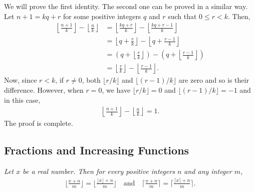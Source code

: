 \documentclass[12pt]{subfile}
\begin{document}
    \begin{solution}
    	We will prove the first identity. The second one can be proved in a similar way. Let $n+1=kq+r$ for some positive integers $q$ and $r$ such that $0 \leq r <k$. Then,
    	\begin{align*}
    	\left\lfloor \frac{n+1}{k} \right\rfloor - \left\lfloor \frac{n}{k} \right\rfloor &=\left\lfloor \frac{kq+r}{k} \right\rfloor - \left\lfloor \frac{kq+r-1}{k} \right\rfloor\\
    	&= \left\lfloor q+\frac{r}{k} \right\rfloor - \left\lfloor q+\frac{r-1}{k} \right\rfloor\\
    	&= \left(q+\left\lfloor \frac{r}{k} \right\rfloor\right) - \left(q+\left\lfloor \frac{r-1}{k} \right\rfloor\right)\\
    	&= \left\lfloor \frac{r}{k} \right\rfloor - \left\lfloor \frac{r-1}{k} \right\rfloor.
    	\end{align*}
    	Now, since $r<k$, if $r \neq 0$, both $\lfloor r/k \rfloor$ and $\lfloor (r-1)/k \rfloor$ are zero and so is their difference. However, when $r=0$, we have $\lfloor r/k \rfloor=0$ and $\lfloor (r-1)/k \rfloor=-1$ and in this case,
    	\begin{align*}
    	\left\lfloor \frac{n+1}{k} \right\rfloor - \left\lfloor \frac{n}{k} \right\rfloor = 1.
    	\end{align*}
    	The proof is complete.
    \end{solution}

    \subsection{Fractions and Increasing Functions}
    \begin{theorem}\slshape
    	Let $x$ be a real number. Then for every positive integers $n$ and any integer $m$,
    	\begin{align*}
    	\bigg\lfloor \frac{x+n}{m}\bigg\rfloor = \bigg\lfloor \frac{\lfloor x \rfloor+n}{m}\bigg\rfloor \quad \text{and} \quad \bigg\lceil \frac{x+n}{m}\bigg\rceil = \bigg\lceil \frac{\lceil x \rceil+n}{m}\bigg\rceil.
    	\end{align*}
    \end{theorem}
\end{document}
